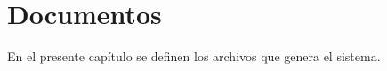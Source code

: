 \chapter{Documentos}
\label{cap:documentos}

En el presente capítulo se definen los archivos que genera el sistema.


	


	
